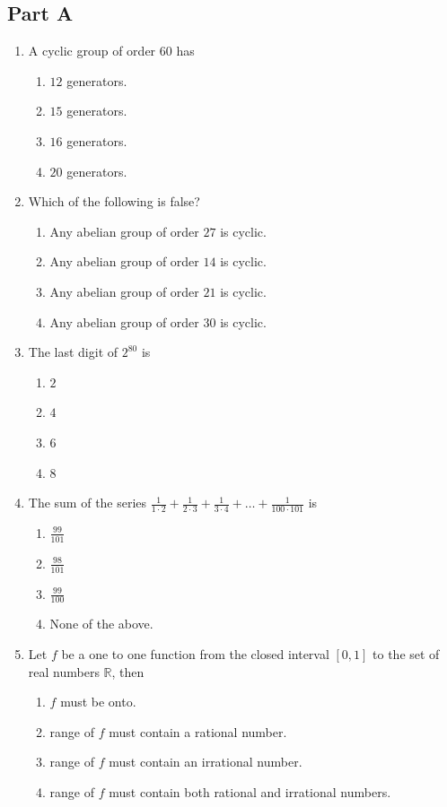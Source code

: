 \documentclass[11pt, a4paper]{article}
\begin{document}
\subsection*{Part A}
\begin{enumerate}
  \item A cyclic group of order $60$ has
  \begin{enumerate}[label=(\alph*)]
    \item $12$ generators.
    \item $15$ generators.
    \item $16$ generators.
    \item $20$ generators.
  \end{enumerate}

  \item Which of the following is false?
  \begin{enumerate}[label=(\alph*)]
    \item Any abelian group of order $27$ is cyclic.
    \item Any abelian group of order $14$ is cyclic.
    \item Any abelian group of order $21$ is cyclic.
    \item Any abelian group of order $30$ is cyclic.
  \end{enumerate}

  \item The last digit of $2^{80}$ is
  \begin{enumerate}[label=(\alph*)]
    \item $2$
    \item $4$
    \item $6$
    \item $8$
  \end{enumerate}

  \item The sum of the series $\displaystyle \frac{1}{1 \cdot 2} + \frac{1}{2 \cdot 3} + \frac{1}{3 \cdot 4} + \dots + \frac{1}{100 \cdot 101}$ is
  \begin{enumerate}[label=(\alph*)]
    \item $\frac{99}{101}$
    \item $\frac{98}{101}$
    \item $\frac{99}{100}$
    \item None of the above.
  \end{enumerate}

  \item Let $f$ be a one to one function from the closed interval $[0, 1]$ to the set of real numbers $\mathbb{R}$, then
  \begin{enumerate}[label=(\alph*)]
    \item $f$ must be onto.
    \item range of $f$ must contain a rational number.
    \item range of $f$ must contain an irrational number.
    \item range of $f$ must contain both rational and irrational numbers.
  \end{enumerate}


\end{enumerate}
\end{document}
